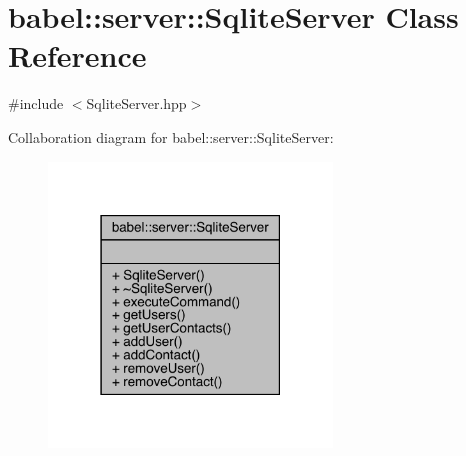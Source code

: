\hypertarget{classbabel_1_1server_1_1_sqlite_server}{}\section{babel\+:\+:server\+:\+:Sqlite\+Server Class Reference}
\label{classbabel_1_1server_1_1_sqlite_server}


{\ttfamily \#include $<$Sqlite\+Server.\+hpp$>$}



Collaboration diagram for babel\+:\+:server\+:\+:Sqlite\+Server\+:\nopagebreak
\begin{figure}[H]
\begin{center}
\leavevmode
\includegraphics[width=214pt]{classbabel_1_1server_1_1_sqlite_server__coll__graph}
\end{center}
\end{figure}
